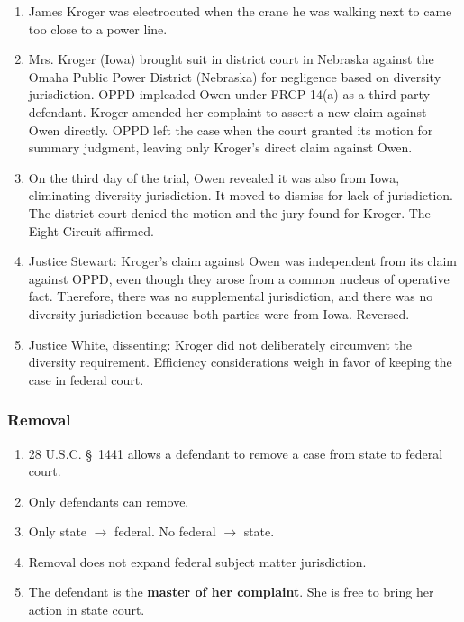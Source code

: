\begin{enumerate}
    \item James Kroger was electrocuted when the crane he was walking next to 
    came too close to a power line.
    \item Mrs. Kroger (Iowa) brought suit in district court in Nebraska 
    against the Omaha Public Power District (Nebraska) for negligence based on 
    diversity jurisdiction. OPPD impleaded Owen under FRCP 14(a) as a 
    third-party defendant. Kroger amended her complaint to assert a new claim 
    against Owen directly. OPPD left the case when the court granted its 
    motion for summary judgment, leaving only Kroger's direct claim against 
    Owen.
    \item On the third day of the trial, Owen revealed it was also from Iowa, 
    eliminating diversity jurisdiction. It moved to dismiss for lack of 
    jurisdiction. The district court denied the motion and the jury found for 
    Kroger. The Eight Circuit affirmed.
    \item Justice Stewart: Kroger's claim against Owen was independent from 
    its claim against OPPD, even though they arose from a common nucleus of 
    operative fact. Therefore, there was no supplemental jurisdiction, and 
    there was no diversity jurisdiction because both parties were from Iowa.  
    Reversed.
    \item Justice White, dissenting: Kroger did not deliberately circumvent 
    the diversity requirement. Efficiency considerations weigh in favor of 
    keeping the case in federal court.  \end{enumerate}

\subsubsection{Removal}

\begin{enumerate}
    \item 28 U.S.C. \S\ 1441 allows a defendant to remove a case from state to 
    federal court.
    \item Only defendants can remove.
    \item Only state $\rightarrow$ federal. No federal $\rightarrow$ state.
    \item Removal does not expand federal subject matter jurisdiction.
    \item The defendant is the \textbf{master of her complaint}. She is free 
    to bring her action in state court.
\end{enumerate}

